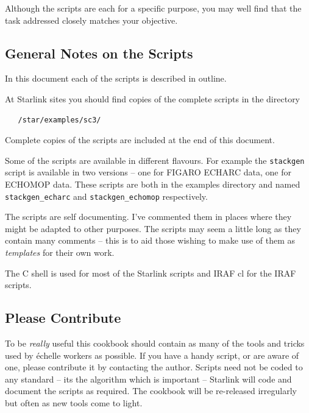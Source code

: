 \documentclass[twoside,11pt]{article}
\newcommand{\xref}[3]{#1}
\newcommand{\xlabel}[1]{}
\renewcommand{\_}{\texttt{\symbol{95}}}
\newcommand{\scspec}[2]{#1}
\newcommand{\scspec}[2]{#2}
\begin{document}
Although the scripts are each for a specific purpose, you may well find that
the task addressed closely matches your objective.

\subsection{\xlabel{general_notes}General Notes on the Scripts }

In this document each of the scripts is described in outline.

At Starlink sites you should find copies of the complete scripts in the
directory

\begin{verbatim}
   /star/examples/sc3/
\end{verbatim}

\begin{htmlonly}
Complete copies of the scripts are included at the end of this document.
\end{htmlonly}

Some of the scripts are available in different flavours.  For example
the \verb+stackgen+ script is available in two versions \scspec{--}{-}
one for \xref{FIGARO}{sun86}{} \xref{ECHARC}{sun86}{ECHARC} data, one for
ECHOMOP data.  These scripts are both in the examples directory and named
\verb+stackgen_echarc+ and \verb+stackgen_echomop+ respectively.

The scripts are self documenting.
I've commented them in places where they might be adapted to other
purposes.
The scripts may seem a little long as they contain many comments
\scspec{--}{-} this is to aid those wishing to make use of them as
{\em templates} for their own work.

The C shell is used for most of the Starlink scripts and IRAF cl for the
IRAF scripts.


\subsection{\xlabel{please_contribute}Please Contribute }

To be {\em really} useful this cookbook should contain as many of the
tools and tricks used by \'{e}chelle workers as possible.
If you have a handy script, or are aware of one, please contribute it by
contacting the author.
Scripts need not be coded to any standard \scspec{--}{-} its the algorithm
which is important \scspec{--}{-} Starlink will code and document the scripts
as required.
The cookbook will be re-released irregularly but often as new tools come to
light.
\end{document}
